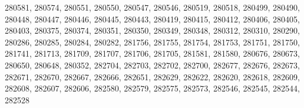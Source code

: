 \begin{appendix}
\begin{itemize}
     280581, 280574, 280551, 280550, 280547, 280546, 280519, 280518, 280499, 280490,\\
     280448, 280447, 280446, 280445, 280443, 280419, 280415, 280412, 280406, 280405,\\
     280403, 280375, 280374, 280351, 280350, 280349, 280348, 280312, 280310, 280290,\\
     280286, 280285, 280284, 280282, 281756, 281755, 281754, 281753, 281751, 281750,\\
     281741, 281713, 281709, 281707, 281706, 281705, 281581, 281580, 280676, 280673,\\
     280650, 280648, 280352, 282704, 282703, 282702, 282700, 282677, 282676, 282673,\\
     282671, 282670, 282667, 282666, 282651, 282629, 282622, 282620, 282618, 282609,\\
     282608, 282607, 282606, 282580, 282579, 282575, 282573, 282546, 282545, 282544,\\
     282528
\end{itemize}


\end{appendix}
